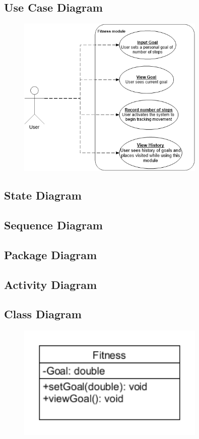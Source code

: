 \subsection{Use Case Diagram}
\begin{figure} 
  \includegraphics[width=0.8\textwidth]{Fitness/FitnessUseCase.png}
\end{figure}

\subsection{State Diagram}

\subsection{Sequence Diagram}

\subsection{Package Diagram}

\subsection{Activity Diagram}

\subsection{Class Diagram}
\begin{figure} 
  \includegraphics[width=0.8\textwidth]{Fitness/FitnessClassDgm.png}
\end{figure}
